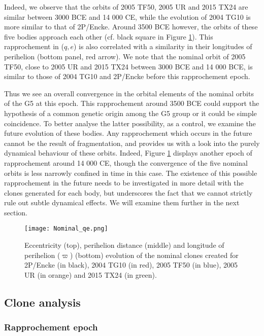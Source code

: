 \documentclass[letters,a4paper,fleqn,usenatbib]{mnras}
\begin{document}
 Indeed, we observe that the orbits of 2005 TF50, 2005 UR and 2015 TX24 are similar between 3000 BCE and 14 000 CE, while the evolution of 2004 TG10 is more similar to that of 2P/Encke. Around 3500 BCE however, the orbits of these five bodies approach each other (cf. black square in Figure \ref{fig:G5_qe}). This rapprochement in ($q,e$) is also correlated with a similarity in their longitudes of perihelion (bottom panel, red arrow). We note that the nominal orbit of 2005 TF50, close to 2005 UR and 2015 TX24 between 3000 BCE and 14 000 BCE, is similar to those of 2004 TG10 and 2P/Encke before this rapprochement epoch. 
 
 Thus we see an overall convergence in the orbital elements of the nominal orbits of the G5 at this epoch. This rapprochement around 3500 BCE could support the hypothesis of a common genetic origin among the G5 group or it could be simple coincidence. To better analyse the latter possibility, as a control, we examine the future evolution of these bodies. Any rapprochement which occurs in the future cannot be the result of fragmentation, and provides us with a look into the purely dynamical behaviour of these orbits. Indeed, Figure \ref{fig:G5_qe} displays another epoch of rapprochement around 14 000 CE, though the convergence of the five nominal orbits is less narrowly confined in time in this case. The existence of this possible rapprochement in the future needs to be investigated in more detail with the clones generated for each body, but underscores the fact that we cannot strictly rule out subtle dynamical effects. We will examine them further in the next section.

 
\begin{figure}
	\texttt{[image: Nominal\_qe.png]}\\
	\caption{Eccentricity (top), perihelion distance (middle) and longitude of perihelion ($\varpi$) (bottom) evolution of the nominal clones created for 2P/Encke (in black), 2004 TG10 (in red), 2005 TF50 (in blue), 2005 UR (in orange) and 2015 TX24 (in green).}
	\label{fig:G5_qe}
\end{figure}

 \subsection{Clone analysis} \label{sec:G5_rapprochements}
 
 \subsubsection{Rapprochement epoch}
 
\end{document}
